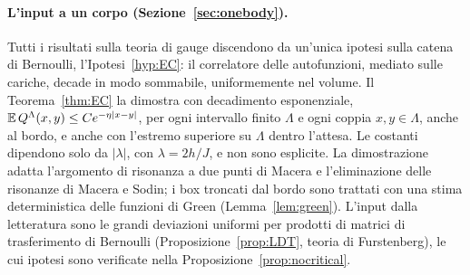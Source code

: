 \documentclass[11pt]{article}
\theoremstyle{stmtplain}
\theoremstyle{stmtdef}
\begin{document}
\paragraph{L'input a un corpo (Sezione~\ref{sec:onebody}).}
Tutti i risultati sulla teoria di gauge discendono da un'unica ipotesi sulla catena di Bernoulli,
l'Ipotesi~\ref{hyp:EC}: il correlatore delle autofunzioni, mediato sulle cariche, decade in modo sommabile,
uniformemente nel volume. Il Teorema~\ref{thm:EC} la dimostra con decadimento esponenziale,
$\mathbb{E}\,Q^\Lambda(x,y)\le Ce^{-\eta|x-y|}$, per ogni intervallo finito $\Lambda$ e ogni coppia $x,y\in\Lambda$, anche
al bordo, e anche con l'estremo superiore su $\Lambda$ dentro l'attesa. Le costanti dipendono solo da $|\lambda|$,
con $\lambda=2h/J$, e non sono esplicite. La dimostrazione adatta l'argomento di risonanza a due punti di Macera e
l'eliminazione delle risonanze di Macera e Sodin; i box troncati dal bordo sono trattati con una stima
deterministica delle funzioni di Green (Lemma~\ref{lem:green}). L'input dalla letteratura sono le grandi deviazioni
uniformi per prodotti di matrici di trasferimento di Bernoulli (Proposizione~\ref{prop:LDT}, teoria di
Furstenberg), le cui ipotesi sono verificate nella Proposizione~\ref{prop:nocritical}.
\end{document}
